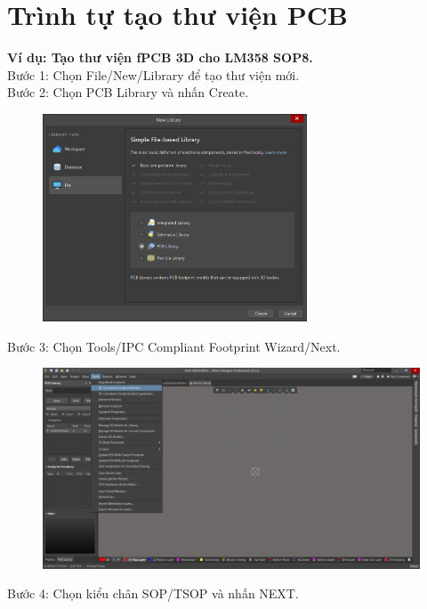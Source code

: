     \section{Trình tự tạo thư viện PCB }
        \textbf{Ví dụ: Tạo thư viện fPCB 3D cho LM358 SOP8.}\\
        Bước 1: Chọn File/New/Library để tạo thư viện mới.\\
        Bước 2: Chọn PCB Library và nhấn Create.
        \begin{figure}[H]
            \centering
            \includegraphics[width=0.7\textwidth]{pictures/ch3.4.png}
        \end{figure}
        Bước 3: Chọn Tools/IPC Compliant Footprint Wizard/Next.
        \begin{figure}[H]
            \centering
            \includegraphics[width=1\textwidth]{pictures/ch3.5.png}
        \end{figure}
        Bước 4: Chọn kiểu chân SOP/TSOP và nhấn NEXT.
